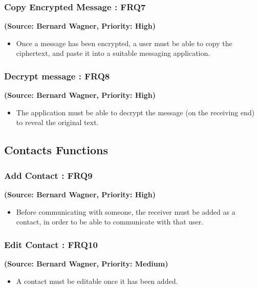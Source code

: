 \subsubsection{Copy Encrypted Message : FRQ7}
\textbf{(Source: Bernard Wagner, Priority: High)}
\begin{itemize}
\item Once a message has been encrypted, a user must be able to copy the ciphertext, and paste it into a suitable messaging application.
\end{itemize}
\subsubsection{Decrypt message : FRQ8}
\textbf{(Source: Bernard Wagner, Priority: High)}
\begin{itemize}
\item The application must be able to decrypt the message (on the receiving end) to reveal the original text.
\end{itemize}

\subsection{Contacts Functions}

\subsubsection{Add Contact : FRQ9}
\textbf{(Source: Bernard Wagner, Priority: High)}
\begin{itemize}
\item Before communicating with someone, the receiver must be added as a contact, in order to be able to communicate with that user.
\end{itemize}
\subsubsection{Edit Contact : FRQ10}
\textbf{(Source: Bernard Wagner, Priority: Medium)}
\begin{itemize}
\item A contact must be editable once it has been added.
\end{itemize}

